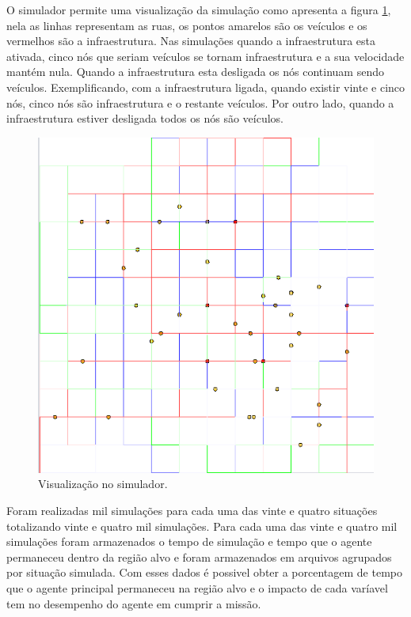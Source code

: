 O simulador permite uma visualização da simulação como apresenta a figura \ref{fig:visulizacaoSimulador}, nela as linhas representam as ruas, os pontos amarelos são os veículos e os vermelhos são a infraestrutura. Nas simulações quando a infraestrutura esta ativada, cinco nós que seriam veículos se tornam infraestrutura e a sua velocidade mantém nula. Quando a infraestrutura esta desligada os nós continuam sendo veículos. Exemplificando, com a infraestrutura ligada, quando existir vinte e cinco nós, cinco nós são infraestrutura e o restante veículos. Por outro lado, quando a infraestrutura estiver desligada todos os nós são veículos.

\begin{figure}[htbp]
	\centering
	\includegraphics[scale=0.4]{metodologia/figuras/simulacaoGrubix.png}
	\caption{Visualização no simulador.}
	\label{fig:visulizacaoSimulador}
\end{figure}

Foram realizadas mil simulações para cada uma das vinte e quatro situações totalizando vinte e quatro mil simulações. Para cada uma das vinte e quatro mil simulações foram armazenados o tempo de simulação e tempo que o agente permaneceu dentro da região alvo e foram armazenados em arquivos agrupados por situação simulada. Com esses dados é possivel obter a porcentagem de tempo que o agente principal permaneceu na região alvo e o impacto de cada varíavel tem no desempenho do agente em cumprir a missão.
